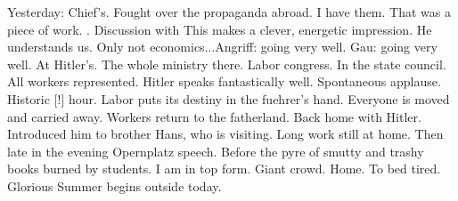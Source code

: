 Yesterday: Chief's. Fought over the propaganda abroad. I have them. That was a piece of work. . Discussion with  This makes a clever, energetic impression. He understands us. Only not economics...Angriff: going very well. Gau: going very well. At Hitler's. The whole ministry there. Labor congress. In the state council. All workers represented. Hitler speaks fantastically well. Spontaneous applause. Historic [!] hour. Labor puts its destiny in the fuehrer's hand. Everyone is moved and carried away. Workers return to the fatherland. Back home with Hitler. Introduced him to brother Hans, who is visiting. Long work still at home. Then late in the evening Opernplatz speech. Before the pyre of smutty and trashy books burned by students. I am in top form. Giant crowd. Home. To bed tired. Glorious Summer begins outside today.

